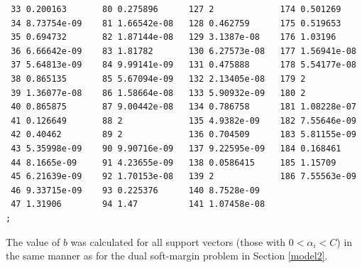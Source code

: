 \documentclass{article}
\begin{document}
\begin{verbatim}
 33 0.200163       80 0.275896      127 2             174 0.501269
 34 8.73754e-09    81 1.66542e-08   128 0.462759      175 0.519653
 35 0.694732       82 1.87144e-08   129 3.1387e-08    176 1.03196
 36 6.66642e-09    83 1.81782       130 6.27573e-08   177 1.56941e-08
 37 5.64813e-09    84 9.99141e-09   131 0.475888      178 5.54177e-08
 38 0.865135       85 5.67094e-09   132 2.13405e-08   179 2
 39 1.36077e-08    86 1.58664e-08   133 5.90932e-09   180 2
 40 0.865875       87 9.00442e-08   134 0.786758      181 1.08228e-07
 41 0.126649       88 2             135 4.9382e-09    182 7.55646e-09
 42 0.40462        89 2             136 0.704509      183 5.81155e-09
 43 5.35998e-09    90 9.90716e-09   137 9.22595e-09   184 0.168461
 44 8.1665e-09     91 4.23655e-09   138 0.0586415     185 1.15709
 45 6.21639e-09    92 1.70153e-08   139 2             186 7.55563e-09
 46 9.33715e-09    93 0.225376      140 8.7528e-09
 47 1.31906        94 1.47          141 1.07458e-08
;

\end{verbatim}

The value of \(b\) was calculated for all support vectors (those with \(0 < \alpha_i < C\)) in the same manner as for the dual soft-margin problem in Section \ref{model2}.
\end{document}
